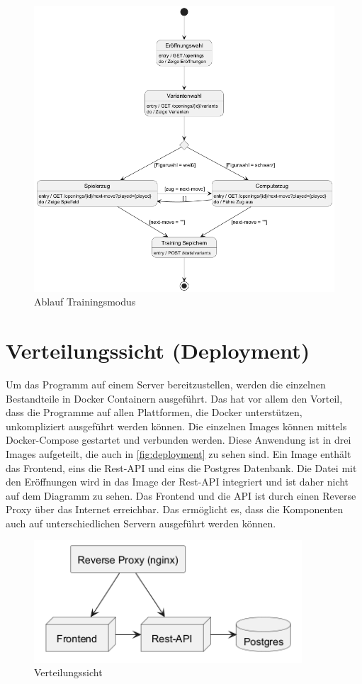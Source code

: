\begin{figure}[h]
    \includegraphics[width=\linewidth]{images/diagrams/sd_training}
    \caption{Ablauf Trainingsmodus}
    \label{fig:sd_training}
\end{figure}

\clearpage

\section{Verteilungssicht (Deployment)}
Um das Programm auf einem Server bereitzustellen, werden die einzelnen Bestandteile in Docker Containern ausgeführt. Das hat vor allem den Vorteil, dass die Programme auf allen Plattformen, die Docker unterstützen, unkompliziert ausgeführt werden können. Die einzelnen Images können mittels Docker-Compose gestartet und verbunden werden. Diese Anwendung ist in drei Images aufgeteilt, die auch in \autoref{fig:deployment} zu sehen sind. Ein Image enthält das Frontend, eins die Rest-API und eins die Postgres Datenbank. Die Datei mit den Eröffnungen wird in das Image der Rest-API integriert und ist daher nicht auf dem Diagramm zu sehen. Das Frontend und die API ist durch einen Reverse Proxy über das Internet erreichbar. Das ermöglicht es, dass die Komponenten auch auf unterschiedlichen Servern ausgeführt werden können.
 
\begin{figure}[h]
    \centering
    \includegraphics[width=10cm]{images/diagrams/deployment}
    \caption{Verteilungssicht}
    \label{fig:deployment}
\end{figure}

